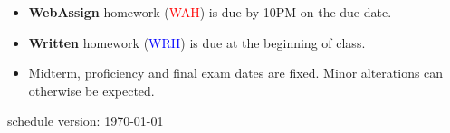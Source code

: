 \documentclass[12pt]{article}
\begin{document}
\begin{itemize}
\item \textbf{WebAssign} homework (\textcolor{red}{WAH}) is due by 10PM on the due date. 
\item \textbf{Written} homework (\textcolor{blue}{WRH}) is due at the beginning of class.
\item Midterm, proficiency and final exam dates are fixed. Minor
alterations can otherwise be expected.
\end{itemize}



\vfill
\hfill \scriptsize schedule version: \today \normalsize
\end{document}
